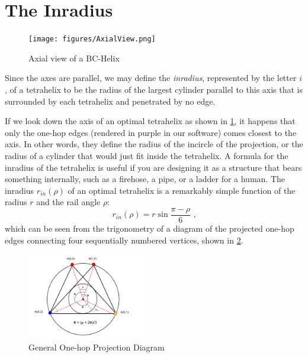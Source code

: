 \documentclass[twocolumn,10pt]{asme2ej}
\begin{document}
\section{The Inradius}

\begin{figure}
     \centering
     \texttt{[image: figures/AxialView.png]}
     \caption{Axial view of a BC-Helix}
  \label{axialview}     
\end{figure}

Since the axes are parallel, we may define the \emph{inradius}, represented by the letter $i$, of a
tetrahelix to be the radius of the largest
cylinder parallel to this axis that is surrounded by each tetrahelix and penetrated by no edge.


If we look down the axis of an optimal tetrahelix as shown in \cref{axialview}, it happens that only
the one-hop edges
(rendered in purple in our software)
comes closest to the axis. In other words, they define the radius of the incircle of the
projection, or the radius of a cylinder that would just fit inside the tetrahelix.
A formula for the inradius of the tetrahelix is useful if you are designing it as a structure that bears something internally,
such as a firehose, a pipe, or
a ladder for a human. The inradius $r_{in}(\rho)$ of
an optimal tetrahelix is a remarkably simple function of the radius $r$ and the rail angle $\rho$:
\begin{equation}
  \label{eq:inradius}
  r_{in}(\rho) = r \sin{\frac{\pi - \rho}{6}} \text{ ,}
\end{equation}
which can be seen from the trigonometry of a diagram of the projected one-hop edges
connecting four sequentially numbered vertices, shown in \cref{fig:projectiondiagram}.

\begin{figure}
     \centering
     \includegraphics[width=0.45\textwidth]{figures/GeneralProjectionDiagramV2.png}
     \caption{General One-hop Projection Diagram}
  \label{fig:projectiondiagram}
\end{figure}
\end{document}
